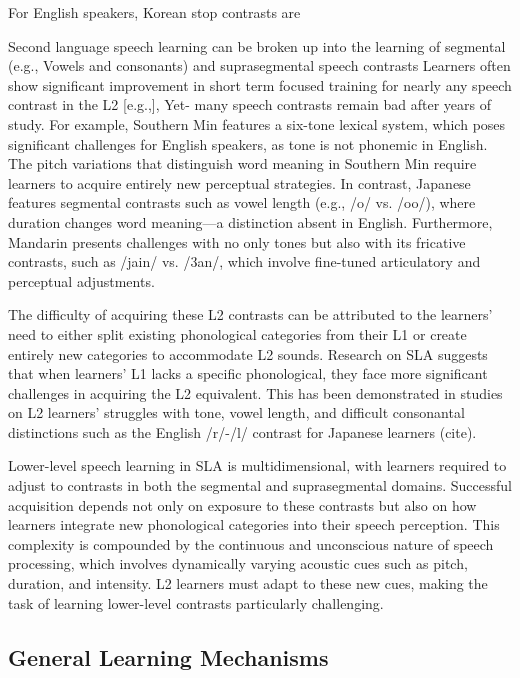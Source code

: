 For English speakers, Korean stop contrasts are 

Second language speech learning can be broken up into the learning of segmental (e.g., Vowels and consonants) and suprasegmental speech contrasts
Learners often show significant improvement in short term focused training for nearly any speech contrast in the L2 [e.g.,]{}, Yet- many speech contrasts remain bad after years of study. For example, Southern Min features a six-tone lexical system, which poses significant challenges for English speakers, as tone is not phonemic in English. The pitch variations that distinguish word meaning in Southern Min require learners to acquire entirely new perceptual strategies. In contrast, Japanese features segmental contrasts such as vowel length (e.g., /o/ vs. /oo/), where duration changes word meaning—a distinction absent in English. Furthermore, Mandarin presents challenges with no only tones but also with its fricative contrasts, such as /jain/ vs. /3an/, which involve fine-tuned articulatory and perceptual adjustments.


The difficulty of acquiring these L2 contrasts can be attributed to the learners’ need to either split existing phonological categories from their L1 or create entirely new categories to accommodate L2 sounds. Research on SLA suggests that when learners' L1 lacks a specific phonological, they face more significant challenges in acquiring the L2 equivalent. This has been demonstrated in studies on L2 learners' struggles with tone, vowel length, and difficult consonantal distinctions such as the English /r/-/l/ contrast for Japanese learners (cite).



Lower-level speech learning in SLA is multidimensional, with learners required to adjust to contrasts in both the segmental and suprasegmental domains. Successful acquisition depends not only on exposure to these contrasts but also on how learners integrate new phonological categories into their speech perception. This complexity is compounded by the continuous and unconscious nature of speech processing, which involves dynamically varying acoustic cues such as pitch, duration, and intensity. L2 learners must adapt to these new cues, making the task of learning lower-level contrasts particularly challenging.

\subsection{General Learning Mechanisms}

